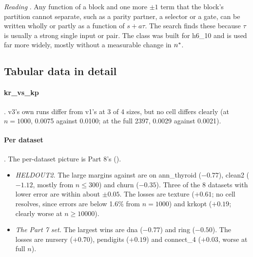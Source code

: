 \noindent\emph{Reading} . Any function of a block and one more $\pm1$ term that the block's partition cannot separate, such as a parity partner, a selector or a gate, can be written wholly or partly as a function of $s+a\tau$. The search finds these because $\tau$ is usually a strong single input or pair. The class was built for h6\_10 and is used far more widely, mostly without a measurable change in $n^{*}$.

\subsection{Tabular data in detail}\label{app:further-tab}

\paragraph{kr\_vs\_kp} . v3's own runs differ from v1's at 3 of 4 sizes, but no cell differs clearly (at $n=1000$, 0.0075 against 0.0100; at the full 2397, 0.0029 against 0.0021).

\paragraph{Per dataset} . The per-dataset picture is Part 8's ().
\begin{itemize}
\item \emph{HELDOUT2.} The large margins against  are on ann\_thyroid ($-0.77$), clean2 ($-1.12$, mostly from $n\le300$) and churn ($-0.35$). Three of the 8 datasets with lower error are within about $\pm0.05$. The losses are texture ($+0.61$; no cell resolves, since errors are below 1.6\% from $n=1000$) and krkopt ($+0.19$; clearly worse at $n\ge10000$).
\item \emph{The Part 7 set.} The largest wins are dna ($-0.77$) and ring ($-0.50$). The losses are nursery ($+0.70$), pendigits ($+0.19$) and connect\_4 ($+0.03$, worse at full $n$).
\end{itemize}

